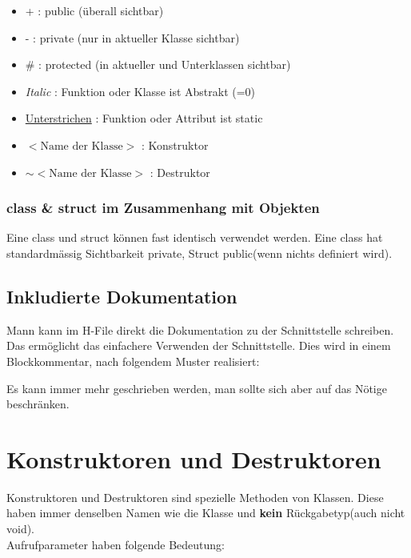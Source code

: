 \begin{itemize}[itemsep=1pt, parsep=0pt]
    \item + : public (überall sichtbar)
    \item - : private (nur in  aktueller Klasse sichtbar)
    \item \# : protected (in aktueller und Unterklassen sichtbar)
    \item \textit{Italic} : Funktion oder Klasse ist Abstrakt (=0)
    \item \underline{Unterstrichen} : Funktion oder Attribut ist static
    \item $<\text{Name der Klasse}>$ :  Konstruktor
    \item $\sim<\text{Name der Klasse}>$ : Destruktor
\end{itemize}



\subsubsection{class \& struct im Zusammenhang mit Objekten}

Eine class und struct können fast identisch verwendet werden. 
Eine class hat standardmässig Sichtbarkeit private, Struct public(wenn nichts definiert wird).

\subsection{Inkludierte Dokumentation}

Mann kann im H-File direkt die Dokumentation zu der Schnittstelle schreiben. 
Das ermöglicht das einfachere Verwenden der Schnittstelle.
Dies wird in einem Blockkommentar, nach folgendem Muster realisiert:



Es kann immer mehr geschrieben werden, man sollte sich aber auf das Nötige beschränken.

\section{Konstruktoren und Destruktoren}

Konstruktoren und Destruktoren sind spezielle Methoden von Klassen. 
Diese haben immer denselben Namen wie die Klasse und \textbf{kein} Rückgabetyp(auch nicht void).\\
Aufrufparameter haben folgende Bedeutung:

